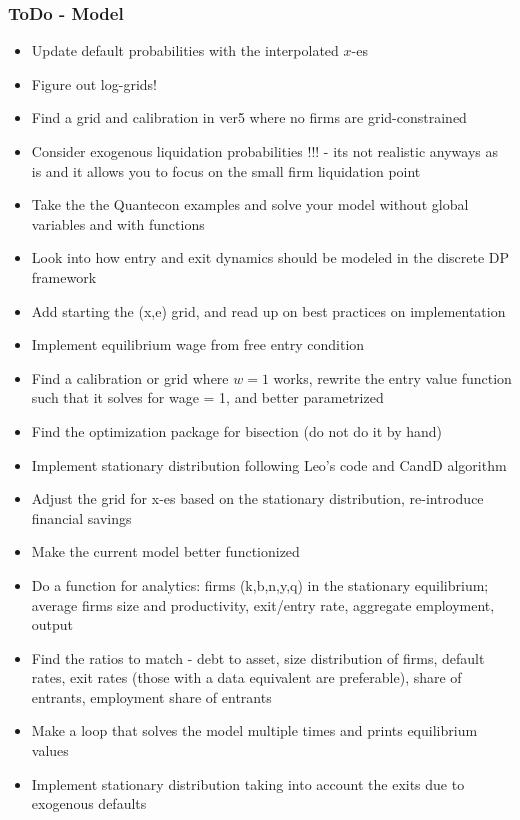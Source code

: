 \documentclass[12pt]{article}
\begin{document}
\subsubsection*{ToDo - Model}
\begin{itemize}\setlength\itemsep{0em} \small
    \item Update default probabilities with the interpolated $x$-es \checkmark
    \item Figure out log-grids! \checkmark
    \item Find a grid and calibration in ver5 where no firms are grid-constrained \checkmark
    \item Consider exogenous liquidation probabilities !!! - its not realistic anyways as is and it allows you to focus on the small firm liquidation point \checkmark
    \item Take the the Quantecon examples and solve your model without global variables and with functions \checkmark
    \item Look into how entry and exit dynamics should be modeled in the discrete DP framework \checkmark
    \item Add starting the (x,e) grid, and read up on best practices on implementation \checkmark
    \item Implement equilibrium wage from free entry condition \checkmark
    \item Find a calibration or grid where $w=1$ works, rewrite the entry value function such that it solves for wage = 1, and better parametrized \checkmark
    \item Find the optimization package for bisection (do not do it by hand) \checkmark
    \item Implement stationary distribution following Leo's code and CandD algorithm \checkmark
    \item Adjust the grid for x-es based on the stationary distribution, re-introduce financial savings \checkmark
    \item Make the current model better functionized \checkmark
    \item Do a function for analytics: firms (k,b,n,y,q) in the stationary equilibrium; average firms size and productivity, exit/entry rate, aggregate employment, output \checkmark
    \item Find the ratios to match - debt to asset, size distribution of firms, default rates, exit rates (those with a data equivalent are preferable), share of entrants, employment share of  entrants \checkmark
    \item Make a loop that solves the model multiple times and prints equilibrium values \checkmark
    \item Implement stationary distribution taking into account the exits due to exogenous defaults \checkmark

\end{itemize} \normalsize

\newpage


    
\end{document}
